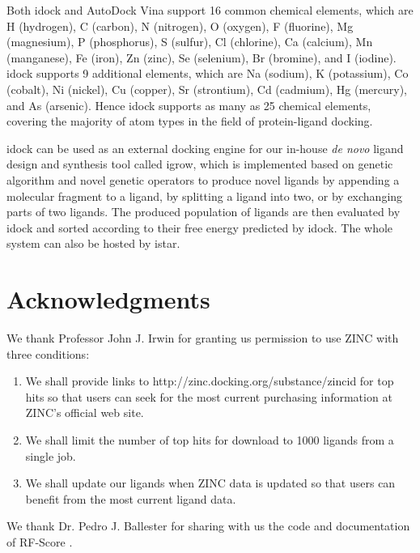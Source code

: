 \documentclass[10pt]{article}
\begin{document}
Both idock and AutoDock Vina support 16 common chemical elements, which are H (hydrogen), C (carbon), N (nitrogen), O (oxygen), F (fluorine), Mg (magnesium), P (phosphorus), S (sulfur), Cl (chlorine), Ca (calcium), Mn (manganese), Fe (iron), Zn (zinc), Se (selenium), Br (bromine), and I (iodine). idock supports 9 additional elements, which are Na (sodium), K (potassium), Co (cobalt), Ni (nickel), Cu (copper), Sr (strontium), Cd (cadmium), Hg (mercury), and As (arsenic). Hence idock supports as many as 25 chemical elements, covering the majority of atom types in the field of protein-ligand docking.

idock can be used as an external docking engine for our in-house \textit{de novo} ligand design and synthesis tool called igrow, which is implemented based on genetic algorithm and novel genetic operators to produce novel ligands by appending a molecular fragment to a ligand, by splitting a ligand into two, or by exchanging parts of two ligands. The produced population of ligands are then evaluated by idock and sorted according to their free energy predicted by idock. The whole system can also be hosted by istar.


\section*{Acknowledgments}
We thank Professor John J. Irwin for granting us permission to use ZINC \cite{532,1178} with three conditions:
\begin{enumerate}
\item We shall provide links to http://zinc.docking.org/substance/zincid for top hits so that users can seek for the most current purchasing information at ZINC's official web site.
\item We shall limit the number of top hits for download to 1000 ligands from a single job.
\item We shall update our ligands when ZINC data is updated so that users can benefit from the most current ligand data.
\end{enumerate}
We thank Dr. Pedro J. Ballester for sharing with us the code and documentation of RF-Score \cite{564}.


\end{document}
